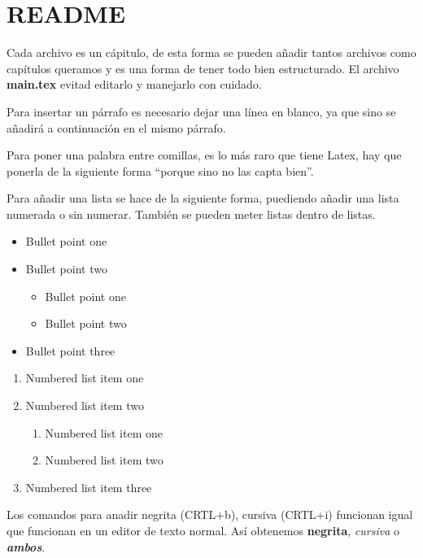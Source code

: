 \pagestyle{fancy}
\chapter*{README} \label{chap:readme} %


Cada archivo es un cápitulo, de esta forma se pueden añadir tantos archivos como capítulos queramos y es una forma de tener todo bien estructurado. El archivo \textbf{main.tex} evitad editarlo y manejarlo con cuidado.

Para insertar un párrafo es necesario dejar una línea en blanco, 
ya que sino se añadirá a continuación en el mismo párrafo.

Para poner una palabra entre comillas, es lo más raro que tiene Latex, hay que ponerla de la siguiente forma ``porque sino no las capta bien''.

Para añadir una lista se hace de la siguiente forma, puediendo añadir una lista numerada o sin numerar. También se pueden meter listas dentro de listas.

\begin{itemize}
    \item Bullet point one
    \item Bullet point two
    \begin{itemize}
        \item Bullet point one
        \item Bullet point two
    \end{itemize}
    \item Bullet point three
\end{itemize}

\begin{enumerate}
    \item Numbered list item one
    \item Numbered list item two
    \begin{enumerate}
        \item Numbered list item one
        \item Numbered list item two
    \end{enumerate}
    \item Numbered list item three
\end{enumerate}

Los comandos para anadir negrita (CRTL+b), cursiva (CRTL+i) funcionan igual que funcionan en un editor de texto normal. Así obtenemos \textbf{negrita}, \textit{cursiva} o \textbf{\textit{ambos}}.

